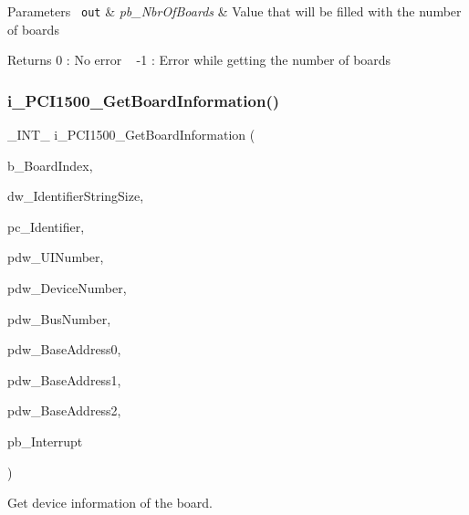 \begin{DoxyParams}[1]{Parameters}
\mbox{\texttt{ out}}  & {\em pb\+\_\+\+Nbr\+Of\+Boards} & Value that will be filled with the number of boards\\
\hline
\end{DoxyParams}
\begin{DoxyReturn}{Returns}
0 \+: No error ~\newline
 -\/1 \+: Error while getting the number of boards ~\newline

\end{DoxyReturn}
\mbox{\label{group___general_gaa7f6b4012cf3a1b83f774d0d3b1d57e5}} 
\subsubsection{\texorpdfstring{i\_PCI1500\_GetBoardInformation()}{i\_PCI1500\_GetBoardInformation()}}
{\footnotesize\ttfamily \+\_\+\+I\+N\+T\+\_\+ i\+\_\+\+P\+C\+I1500\+\_\+\+Get\+Board\+Information (\begin{DoxyParamCaption}\item[{B\+Y\+TE}]{b\+\_\+\+Board\+Index,  }\item[{D\+W\+O\+RD}]{dw\+\_\+\+Identifier\+String\+Size,  }\item[{P\+C\+H\+AR}]{pc\+\_\+\+Identifier,  }\item[{P\+D\+W\+O\+RD}]{pdw\+\_\+\+U\+I\+Number,  }\item[{P\+D\+W\+O\+RD}]{pdw\+\_\+\+Device\+Number,  }\item[{P\+D\+W\+O\+RD}]{pdw\+\_\+\+Bus\+Number,  }\item[{P\+D\+W\+O\+RD}]{pdw\+\_\+\+Base\+Address0,  }\item[{P\+D\+W\+O\+RD}]{pdw\+\_\+\+Base\+Address1,  }\item[{P\+D\+W\+O\+RD}]{pdw\+\_\+\+Base\+Address2,  }\item[{P\+B\+Y\+TE}]{pb\+\_\+\+Interrupt }\end{DoxyParamCaption})}

Get device information of the board.


